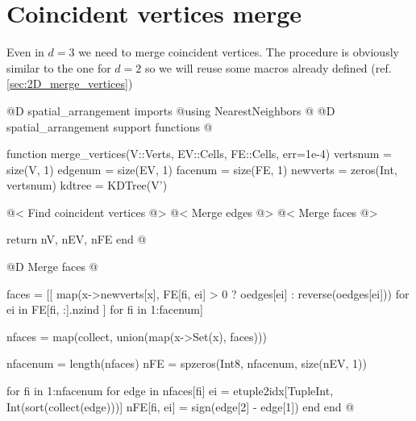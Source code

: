 \section{Coincident vertices merge}
\label{sec:3D_merge_vertices}
Even in $d=3$ we need to merge coincident vertices.
The procedure is obviously similar to the one for $d=2$ so we will
reuse some macros already defined (ref. \ref{sec:2D_merge_vertices})

@D spatial\_arrangement imports
@{using NearestNeighbors
@}
@D spatial\_arrangement support functions
@{function merge_vertices(V::Verts, EV::Cells, FE::Cells, err=1e-4)
    vertsnum = size(V, 1)
    edgenum = size(EV, 1)
    facenum = size(FE, 1)
    newverts = zeros(Int, vertsnum)
    kdtree = KDTree(V')

    @< Find coincident vertices @>
    @< Merge edges @>
    @< Merge faces @>

    return nV, nEV, nFE
end
@}

@D Merge faces
@{faces = [[
    map(x->newverts[x], FE[fi, ei] > 0 ? oedges[ei] : reverse(oedges[ei]))
    for ei in FE[fi, :].nzind
] for fi in 1:facenum]

nfaces = map(collect, union(map(x->Set(x), faces)))

nfacenum = length(nfaces)
nFE = spzeros(Int8, nfacenum, size(nEV, 1))

for fi in 1:nfacenum
    for edge in nfaces[fi]
        ei = etuple2idx[Tuple{Int, Int}(sort(collect(edge)))]
        nFE[fi, ei] = sign(edge[2] - edge[1])
    end
end
@}
